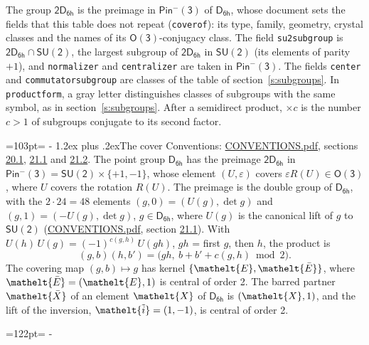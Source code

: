 \documentclass[10pt,a4paper]{article}
\makeatletter
\renewcommand\section{\@startsection{section}{1}{\z@}{-3ex plus -1ex minus -.2ex}%
  {1.2ex plus .2ex}{\normalfont\large\sffamily\bfseries\color{parttitle}}}
\newcommand{\needspace}[1]{\par\penalty-100\begingroup\dimen0=#1\relax\dimen2=\pagegoal
  \advance\dimen2-\pagetotal\ifdim\dimen0>\dimen2\relax\ifdim\dimen2>0pt\vfil\break\fi\fi
  \endgroup}
\numberwithin{equation}{section}
\newcommand{\eltfont}[1]{{\let\sigma\eltsigma\mathelt{#1}}}
\newcommand{\grp}[1]{\mathsf{#1}}
\newcommand{\elt}[1]{\eltfont{#1}}
\newcommand{\dirprod}{\times}
\newcommand{\barred}[1]{\bar{#1}}
\newcommand{\lift}[1]{\tilde{#1}}
\makeatother
\begin{document}
\leavevmode\label{n:element.inversion}\label{n:group.preimage}The group $\grp{2D_{6h}}$ is the preimage in $\grp{Pin^{-}(3)}$ of \href{../../../rotation/data/pdf/D6h.pdf}{$\grp{D_{6h}}$}, whose document sets the fields that this table does not repeat (\texttt{coverof}): its type, family, geometry, crystal classes and the names of its \href{../../../rotation/data/pdf/O3.pdf}{$\grp{O(3)}$}-conjugacy class. The field \texttt{su2subgroup} is $\grp{2D_{6h}} \cap \grp{SU(2)}$, the largest subgroup of $\grp{2D_{6h}}$ in $\grp{SU(2)}$ (its elements of parity $+1$), and \texttt{normalizer} and \texttt{centralizer} are taken in $\grp{Pin^{-}(3)}$. The fields \texttt{center} and \texttt{commutatorsubgroup} are classes of the table of section~\ref{s:subgroups}.
In \texttt{productform}, a gray letter distinguishes classes of subgroups with the same symbol, as in section~\ref{s:subgroups}. \label{n:index.conjugates.c}After a semidirect product, ${\times}c$ is the number $c > 1$ of subgroups conjugate to its second factor.
\needspace{103pt}
\section{The cover}\label{s:cover}
Conventions: \href{../../CONVENTIONS.pdf}{CONVENTIONS.pdf}, sections \href{../../CONVENTIONS.pdf\#conv.20.1}{20.1}, \href{../../CONVENTIONS.pdf\#conv.21.1}{21.1} and \href{../../CONVENTIONS.pdf\#conv.21.2}{21.2}.
\leavevmode\label{n:group.pin.minus}\label{n:group.su2}\label{n:local.pin.sign}\label{n:matrix.covered}\label{n:matrix.lift.su2}\label{n:index.bar}The point group $\grp{D_{6h}}$ has the preimage $\grp{2D_{6h}}$ in $\grp{Pin^{-}(3)} = \grp{SU(2)} \dirprod \{+1, -1\}$, whose element $(U, \varepsilon)$ covers $\varepsilon R(U) \in \grp{O(3)}$, where $U$ covers the rotation $R(U)$. The preimage is the double group of $\grp{D_{6h}}$, with the $2 \cdot 24 = 48$ elements $(g, 0) = (U(g), \det g)$ and $(g, 1) = (-U(g), \det g)$, $g \in \grp{D_{6h}}$, where $U(g)$ is the canonical lift of $g$ to $\grp{SU(2)}$ (\href{../../CONVENTIONS.pdf}{CONVENTIONS.pdf}, section \href{../../CONVENTIONS.pdf\#conv.21.1}{21.1}). \label{n:function.cocycle}With $U(h)\,U(g) = (-1)^{c(g,h)}\,U(gh)$, $gh$ = first $g$, then $h$, the product is
\begin{equation}\label{e:product}(g, b)(h, b') = \bigl(gh,\ b + b' + c(g, h) \bmod 2\bigr).\end{equation}
\leavevmode\label{n:mark.bar}The covering map $(g, b) \mapsto g$ has kernel $\{\elt{E}, \elt{\barred{E}}\}$, where $\elt{\barred{E}} = (\elt{E}, 1)$ is central of order 2. \label{n:element.named}\label{n:mark.lift}The barred partner $\elt{\barred{X}}$ of an element $\elt{X}$ of $\grp{D_{6h}}$ is $(\elt{X}, 1)$, and the lift of the inversion, $\elt{\lift{i}} = (1, -1)$, is central of order 2.
\needspace{122pt}
\end{document}
